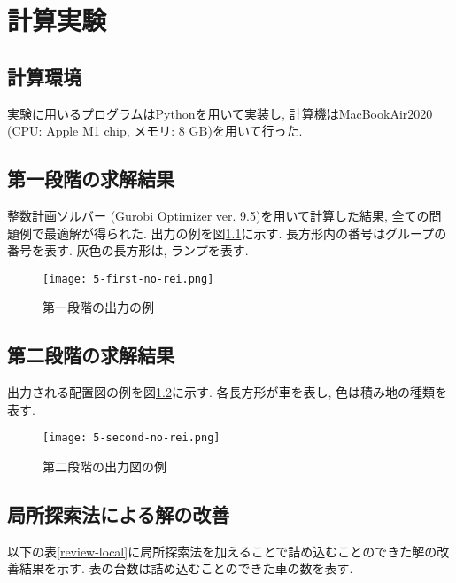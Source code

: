 \chapter{計算実験}\label{computational_result}
\section{計算環境}
実験に用いるプログラムはPythonを用いて実装し, 計算機はMacBookAir2020 (CPU: Apple M1 chip, メモリ: 8 GB)を用いて行った. 

\section{第一段階の求解結果}
整数計画ソルバー (Gurobi Optimizer ver. 9.5)を用いて計算した結果, 全ての問題例で最適解が得られた. 
出力の例を図\ref{first-no-rei}に示す. 
長方形内の番号はグループの番号を表す. 
灰色の長方形は, ランプを表す. \\

\begin{figure}[b]
    \texttt{[image: 5-first-no-rei.png]}
    \caption{第一段階の出力の例}
    \label{first-no-rei}
\end{figure}
\clearpage

\section{第二段階の求解結果}
出力される配置図の例を図\ref{second-no-rei}に示す. 
各長方形が車を表し, 色は積み地の種類を表す. \\

\begin{figure}[b]
    \texttt{[image: 5-second-no-rei.png]}
    \caption{第二段階の出力図の例}
    \label{second-no-rei}
\end{figure}

\section{局所探索法による解の改善}
以下の表\ref{review-local}に局所探索法を加えることで詰め込むことのできた解の改善結果を示す. 
表の台数は詰め込むことのできた車の数を表す. 

